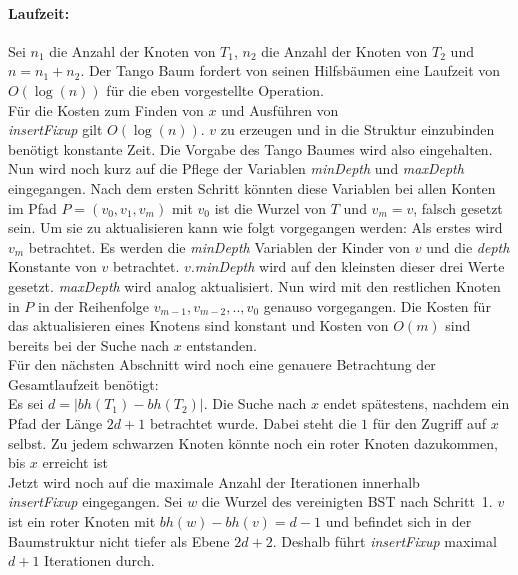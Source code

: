 \documentclass[a4paper,12pt]{article}
\begin{document}
\paragraph{Laufzeit:}
Sei $n_1$ die Anzahl der Knoten von $T_1$, $n_2$ die Anzahl der Knoten von $T_2$ und $n = n_1 + n_2$. Der Tango Baum fordert von seinen Hilfsbäumen eine Laufzeit von $O(\log \left(n\right))$ für die eben vorgestellte Operation.\\ Für die Kosten zum Finden von $x$ und Ausführen von \\ \textit{insertFixup}  gilt $O(\log (n))$. $v$ zu erzeugen und in die Struktur einzubinden benötigt konstante Zeit. 
Die Vorgabe des Tango Baumes wird also eingehalten.\\Nun wird noch kurz auf die Pflege der Variablen  \textit{minDepth} und \textit{maxDepth} eingegangen. Nach dem ersten Schritt könnten diese Variablen bei allen Konten im Pfad $P = \left(v_0, v_1, v_m\right)$ mit $v_0$ ist die Wurzel von $T$ und $v_m = v$, falsch gesetzt sein. Um sie zu aktualisieren kann wie folgt vorgegangen werden: Als erstes wird $v_m$ betrachtet. Es werden die \textit{minDepth} Variablen der Kinder von $v$ und die \textit{depth} Konstante von $v$ betrachtet. $v$.\textit{minDepth} wird auf den kleinsten dieser drei Werte gesetzt. \textit{maxDepth} wird analog aktualisiert. Nun wird mit den restlichen Knoten in $P$ in der Reihenfolge $v_{m-1}, v_{m-2},..,v_0$ genauso vorgegangen. Die Kosten für das aktualisieren eines Knotens sind konstant und Kosten von $O\left(m\right)$ sind bereits bei der Suche nach $x$ entstanden. \\   
Für den nächsten Abschnitt wird noch eine genauere Betrachtung der Gesamtlaufzeit benötigt:\\ Es sei $d = \vert \mathit{bh}(T_1) - \mathit{bh}(T_2)  \vert $. Die Suche nach $x$ endet spätestens, nachdem ein Pfad der Länge $2d + 1$ betrachtet wurde. Dabei steht die $1$ für den Zugriff auf $x$ selbst. Zu jedem schwarzen Knoten könnte noch ein roter Knoten dazukommen, bis $x$ erreicht ist\\
 Jetzt wird noch auf die maximale Anzahl der Iterationen innerhalb \\ \textit{insertFixup} eingegangen.
 Sei $w$ die Wurzel des vereinigten BST nach \mbox{Schritt 1}. $v$ ist ein roter Knoten mit $\mathit{bh}(w) - \mathit{bh}(v) = d - 1$ und befindet sich in der Baumstruktur nicht tiefer als Ebene $2d + 2$. Deshalb führt \textit{insertFixup} maximal $d + 1$ Iterationen durch.  
\end{document}
